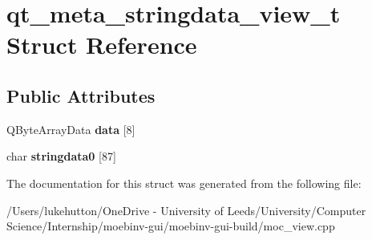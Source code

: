 \hypertarget{structqt__meta__stringdata__view__t}{}\section{qt\+\_\+meta\+\_\+stringdata\+\_\+view\+\_\+t Struct Reference}
\label{structqt__meta__stringdata__view__t}
\subsection*{Public Attributes}
\begin{DoxyCompactItemize}
\item 
\mbox{\label{structqt__meta__stringdata__view__t_a6e138f57139e1ca646beb55e66722aa8}} 
Q\+Byte\+Array\+Data {\bfseries data} \mbox{[}8\mbox{]}
\item 
\mbox{\label{structqt__meta__stringdata__view__t_ab2d1bd5a5cf9dcc07b1cf2eee867b860}} 
char {\bfseries stringdata0} \mbox{[}87\mbox{]}
\end{DoxyCompactItemize}


The documentation for this struct was generated from the following file\+:\begin{DoxyCompactItemize}
\item 
/\+Users/lukehutton/\+One\+Drive -\/ University of Leeds/\+University/\+Computer Science/\+Internship/moebinv-\/gui/moebinv-\/gui-\/build/moc\+\_\+view.\+cpp\end{DoxyCompactItemize}
